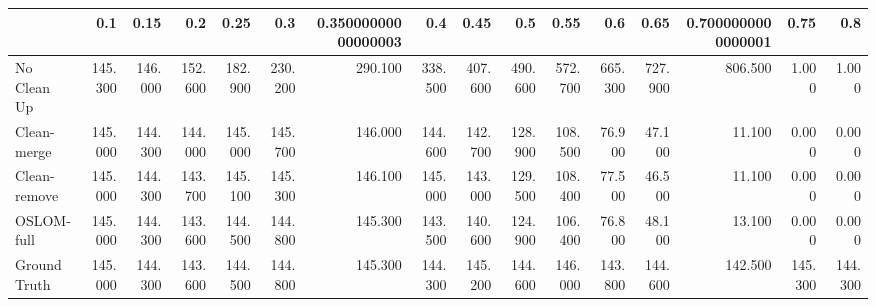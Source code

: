 \begin{tabular}{lrrrrrrrrrrrrrrr}
\toprule
{} &     0.1 &    0.15 &     0.2 &    0.25 &     0.3 & 0.35000000000000003 &     0.4 &    0.45 &     0.5 &    0.55 &     0.6 &    0.65 & 0.7000000000000001 &    0.75 &     0.8 \\
\midrule
No Clean Up  & 145.300 & 146.000 & 152.600 & 182.900 & 230.200 &             290.100 & 338.500 & 407.600 & 490.600 & 572.700 & 665.300 & 727.900 &            806.500 &   1.000 &   1.000 \\
Clean-merge  & 145.000 & 144.300 & 144.000 & 145.000 & 145.700 &             146.000 & 144.600 & 142.700 & 128.900 & 108.500 &  76.900 &  47.100 &             11.100 &   0.000 &   0.000 \\
Clean-remove & 145.000 & 144.300 & 143.700 & 145.100 & 145.300 &             146.100 & 145.000 & 143.000 & 129.500 & 108.400 &  77.500 &  46.500 &             11.100 &   0.000 &   0.000 \\
OSLOM-full   & 145.000 & 144.300 & 143.600 & 144.500 & 144.800 &             145.300 & 143.500 & 140.600 & 124.900 & 106.400 &  76.800 &  48.100 &             13.100 &   0.000 &   0.000 \\
Ground Truth & 145.000 & 144.300 & 143.600 & 144.500 & 144.800 &             145.300 & 144.300 & 145.200 & 144.600 & 146.000 & 143.800 & 144.600 &            142.500 & 145.300 & 144.300 \\
\bottomrule
\end{tabular}
